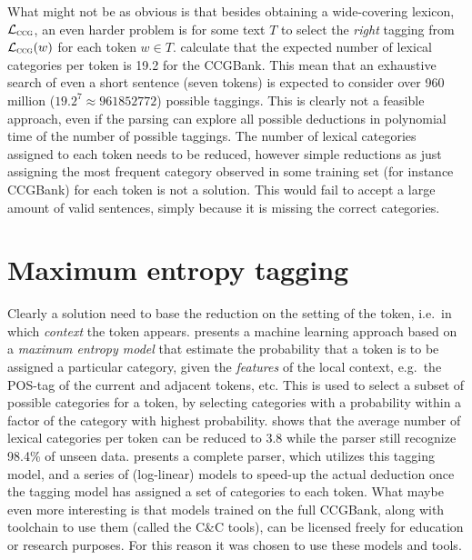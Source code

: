 What might not be as obvious is that besides obtaining a wide-covering lexicon, $\mathcal{L}_\textsc{ccg}$, an even harder problem is for some text $T$ to select the \emph{right} tagging from $\mathcal{L}_\textsc{ccg}(w)$ for each token $w \in T$. \citeauthor{ccgBank}  calculate that the expected number of lexical categories per token is 19.2 for the CCGBank. This mean that an exhaustive search of even a short sentence (seven tokens) is expected to consider over 960 million ($19.2^7 \approx \num{961852772}$) possible taggings. This is clearly not a feasible approach, even if the parsing can explore all possible deductions in polynomial time of the number of possible taggings. %
The number of lexical categories assigned to each token needs to be reduced, however simple reductions as just assigning the most frequent category  observed in some training set (for instance CCGBank) for each token is not a solution. This would fail to accept a large amount of valid sentences, simply because it is missing the correct categories. 

\section{Maximum entropy tagging}
\label{sec:maxEntropy}
Clearly a solution need to base the reduction on the setting of the token, i.e.\ in which \emph{context} the token appears. \citeauthor{suppertagging}  presents a machine learning approach based on a \emph{maximum entropy model} that estimate the probability that a token is to be assigned a particular category, given the \emph{features} of the local context, e.g.\ the POS-tag of the current and adjacent tokens, etc. This is used to select a subset of possible categories for a token, by selecting categories with a probability within a factor of the category with highest probability. \citeauthor{suppertagging} shows that the average number of lexical categories per token can be reduced to 3.8 while the parser still recognize 98.4\% of unseen data. \citeauthor{candc}  presents a complete parser, which utilizes this tagging model, and a series of (log-linear) models to speed-up the actual deduction once the tagging model has assigned a set of categories to each token. What maybe even more interesting is that models trained on the full CCGBank, along with toolchain to use them (called the C\&C tools), can be licensed freely for education or research purposes. For this reason it was chosen to use these models and tools.

